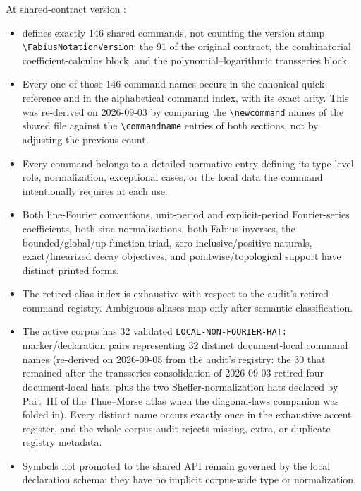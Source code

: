 \documentclass[11pt,oneside]{article}
\theoremstyle{definition}
\theoremstyle{remark}
\DeclareRobustCommand{\shortpath}[1]{\mbox{\path{#1}}}
\DeclareRobustCommand{\modulepath}[1]{\shortpath{#1}}
\DeclareRobustCommand{\commandname}[1]{\texttt{\textbackslash#1}}
\begin{document}
At shared-contract version \FabiusNotationVersion:

\begin{itemize}
\item \modulepath{docs/fabius-notation.tex} defines exactly 146 shared commands, not
      counting the version stamp \commandname{FabiusNotationVersion}: the 91 of the
      original contract, the combinatorial coefficient-calculus block, and the
      polynomial--logarithmic transseries block.
\item Every one of those 146 command names occurs in the canonical quick reference and
      in the alphabetical command index, with its exact arity.  This was re-derived on
      2026-09-03 by comparing the \commandname{newcommand} names of the shared file
      against the \commandname{commandname} entries of both sections, not by
      adjusting the previous count.
\item Every command belongs to a detailed normative entry defining its type-level role,
      normalization, exceptional cases, or the local data the command intentionally
      requires at each use.
\item Both line-Fourier conventions, unit-period and explicit-period Fourier-series
      coefficients, both sinc normalizations, both Fabius inverses, the
      bounded/global/up-function triad, zero-inclusive/positive naturals, exact/linearized
      decay objectives, and pointwise/topological support have distinct printed forms.
\item The retired-alias index is exhaustive with respect to the audit's retired-command
      registry.  Ambiguous aliases map only after semantic classification.
\item The active corpus has 32 validated \texttt{LOCAL-NON-FOURIER-HAT:}
      marker/declaration pairs representing 32 distinct document-local command names
      (re-derived on 2026-09-05 from the audit's registry: the 30 that remained after
      the transseries consolidation of 2026-09-03 retired four document-local hats,
      plus the two Sheffer-normalization hats declared by Part~III of the Thue--Morse
      atlas when the diagonal-laws companion was folded in).
      Every distinct name occurs exactly once in the exhaustive accent register, and the
      whole-corpus audit rejects missing, extra, or duplicate registry metadata.
\item Symbols not promoted to the shared API remain governed by the local declaration
      schema; they have no implicit corpus-wide type or normalization.
\end{itemize}
\end{document}
